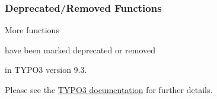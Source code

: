 \begin{frame}[fragile]
	\frametitle{Deprecated/Removed Functions}

	\vspace{0.6cm}
	\begin{center}
		More functions
	\end{center}
	\vspace{-0.8cm}
	\begin{center}
		have been marked deprecated or removed
	\end{center}
	\vspace{-0.8cm}
	\begin{center}
		in TYPO3 version 9.3.
	\end{center}
	\vspace{-0.6cm}
	\begin{center}
		Please see the \href{https://docs.typo3.org/typo3cms/extensions/core/latest/Changelog/9.3/Index.html#deprecation}{TYPO3 documentation} for further details.
	\end{center}

\end{frame}

